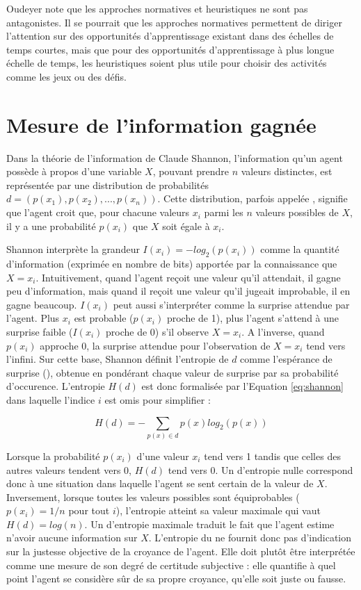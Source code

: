 Oudeyer note que les approches normatives et heuristiques ne sont pas antagonistes. 
Il se pourrait que les approches normatives permettent de diriger l'attention sur des opportunités d'apprentissage existant dans des échelles de temps courtes, mais que pour des opportunités d'apprentissage à plus longue échelle de temps, les heuristiques soient plus utile pour choisir des activités comme les jeux ou des défis. 

\section{Mesure de l'information gagnée}

\noindent
Dans la théorie de l'information de Claude Shannon, l'information qu'un agent possède à propos d'une variable $X$, pouvant prendre $n$ valeurs distinctes, est représentée par une distribution de probabilités $d= (p(x_1), p(x_2), ... , \allowbreak p(x_n))$.
Cette distribution, parfois appelée , signifie que l'agent \og croit \fg que, pour chacune valeurs $x_i$ parmi les $n$ valeurs possibles de $X$, il y a une probabilité $p(x_i)$ que $X$ soit égale à $x_i$. 

Shannon interprète la grandeur $I(x_i) = -log_2(p(x_i))$ comme la quantité d'information (exprimée en nombre de bits) apportée par la connaissance que $X = x_i$. 
Intuitivement, quand l'agent reçoit une valeur qu'il attendait, il gagne peu d'information, mais quand il reçoit une valeur qu'il jugeait improbable, il en gagne beaucoup.
$I(x_i)$ peut aussi s'interpréter comme la \og surprise attendue \fg  par l'agent. 
Plus $x_i$ est probable ($p(x_i)$ proche de 1), plus l'agent s'attend à une surprise faible ($I(x_i)$ proche de 0) s'il observe $X = x_i$. 
A l'inverse, quand $p(x_i)$ approche 0, la surprise attendue pour l'observation de $X=x_i$ tend vers l'infini. 
Sur cette base, Shannon définit l'entropie de $d$ comme l'espérance de surprise (), obtenue en pondérant chaque valeur de surprise par sa probabilité d'occurence.
L'entropie $H(d)$ est donc formalisée par l'Equation \eqref{eq:shannon} dans laquelle l'indice $i$ est omis pour simplifier :

\begin{equation}\label{eq:shannon}
	H(d) = - \sum_{p(x) \in d} p(x) log_2(p(x))
\end{equation}

Lorsque la probabilité $p(x_i)$ d'une valeur $x_i$ tend vers 1 tandis que celles des autres valeurs tendent vers 0, $H(d)$ tend vers 0.
Un  d'entropie nulle correspond donc à une situation dans laquelle l'agent \og se sent certain \fg de la valeur de $X$. 
Inversement, lorsque toutes les valeurs possibles sont équiprobables ($p(x_i) = 1/n$ pour tout $i$), l'entropie atteint sa valeur maximale qui vaut $H(d) = log(n)$. 
Un  d'entropie maximale traduit le fait que l'agent estime n'avoir aucune information sur $X$.
L'entropie du  ne fournit donc pas d'indication sur la justesse objective de la croyance de l'agent.
Elle doit plutôt être interprétée comme une mesure de son degré de certitude subjective : elle quantifie à quel point l’agent se considère sûr de sa propre croyance, qu’elle soit juste ou fausse.

